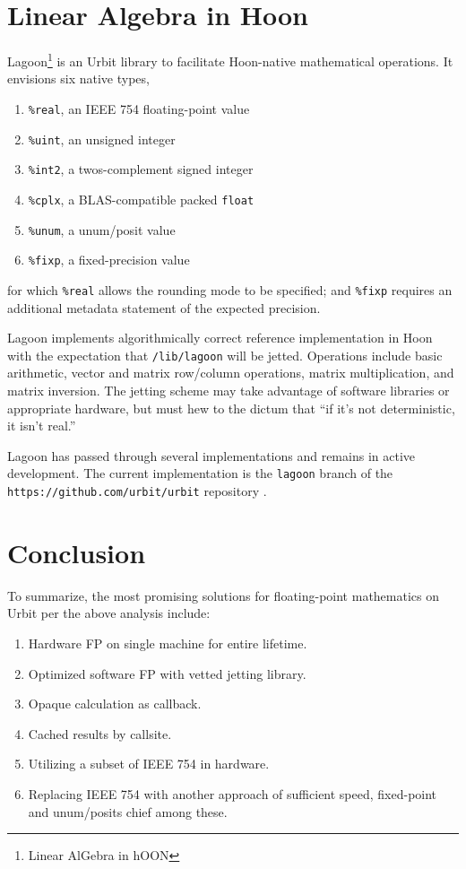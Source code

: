 \documentclass[twoside]{article}
\begin{document}
\section{Linear Algebra in Hoon}

Lagoon\footnote{Linear AlGebra in hOON} is an Urbit library to facilitate Hoon-native mathematical operations.  It envisions six native types,

\begin{enumerate}
  \item  \texttt{\%real}, an IEEE 754 floating-point value
  \item  \texttt{\%uint}, an unsigned integer
  \item  \texttt{\%int2}, a twos-complement signed integer
  \item  \texttt{\%cplx}, a BLAS-compatible packed \texttt{float}
  \item  \texttt{\%unum}, a unum/posit value
  \item  \texttt{\%fixp}, a fixed-precision value
\end{enumerate}

\noindent
for which \texttt{\%real} allows the rounding mode to be specified; and \texttt{\%fixp} requires an additional metadata statement of the expected precision.

Lagoon implements algorithmically correct reference implementation in Hoon with the expectation that \texttt{/lib/lagoon} will be jetted.  Operations include basic arithmetic, vector and matrix row/column operations, matrix multiplication, and matrix inversion.  The jetting scheme may take advantage of software libraries or appropriate hardware, but must hew to the dictum that “if it's not deterministic, it isn't real.”

Lagoon has passed through several implementations and remains in active development.  The current implementation is the \texttt{lagoon} branch of the \texttt{https://github.com/urbit/urbit} repository \citep{Urbit}.


\section{Conclusion}

To summarize, the most promising solutions for floating-point mathematics on Urbit per the above analysis include:

\begin{enumerate}
  \item  Hardware FP on single machine for entire lifetime.
  \item  Optimized software FP with vetted jetting library.
  \item  Opaque calculation as callback.
  \item  Cached results by callsite.
  \item  Utilizing a subset of IEEE 754 in hardware.
  \item  Replacing IEEE 754 with another approach of sufficient speed, fixed-point and unum/posits chief among these.
\end{enumerate}
\end{document}
